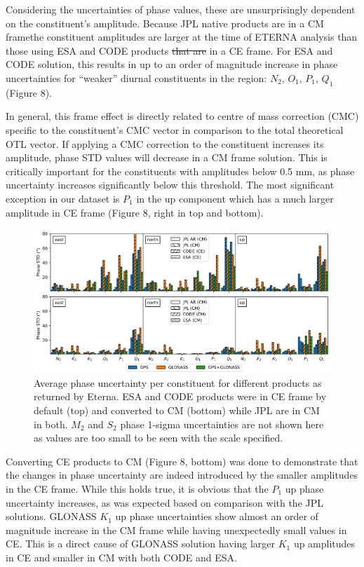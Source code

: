 \documentclass[se, manuscript]{copernicus}
\providecommand{\DIFadd}[1]{{\protect\color{blue}\uwave{#1}}} %
\providecommand{\DIFdel}[1]{{\protect\color{red}\sout{#1}}}                      %
\providecommand{\DIFaddbegin}{} %
\providecommand{\DIFaddend}{} %
\providecommand{\DIFdelbegin}{} %
\providecommand{\DIFdelend}{} %
\begin{document}
Considering the uncertainties of phase values, these are unsurprisingly dependent on the constituent’s amplitude. Because JPL native products are in a CM frame\DIFaddbegin \DIFadd{, }\DIFaddend the constituent amplitudes are larger at the time of ETERNA analysis than those using ESA and CODE products \DIFdelbegin \DIFdel{that are }\DIFdelend \DIFaddbegin \DIFadd{which are both provided }\DIFaddend in a CE frame. For \DIFaddbegin \DIFadd{the }\DIFaddend ESA and CODE solution, this results in up to an order of magnitude increase in phase uncertainties for “weaker” diurnal constituents in the region: $N_2$, $O_1$, $P_1$, $Q_1$ (Figure 8).

In general, this frame effect is directly related to centre of mass correction (CMC) specific to the constituent's CMC vector in comparison to the total theoretical OTL vector. If applying a CMC correction to the constituent increases its amplitude, phase STD values will decrease in a CM frame solution. This is critically important for the constituents with amplitudes below 0.5 mm, as phase uncertainty increases significantly below this threshold. The most significant exception in our dataset is $P_1$ in the up component which has a much larger amplitude in CE frame (Figure 8, right in top and bottom). 

\begin{figure}[t]
\includegraphics[width=17cm]{fig08.png}
\caption{Average phase uncertainty per constituent for different products as returned by Eterna. ESA and CODE products were in CE frame by default (top) and converted to CM (bottom) while JPL are in CM in both. $M_2$ and $S_2$ phase 1-sigma uncertainties are not shown here as values are too small to be seen with the scale specified.}
\end{figure}

Converting CE products to CM (Figure 8, bottom) was done to demonstrate that the changes in phase uncertainty are indeed introduced by the smaller amplitudes in the CE frame. While this holds true, it is obvious that the $P_1$ up phase uncertainty increases, as was expected based on comparison with the JPL solutions. GLONASS $K_1$ up phase uncertainties show almost an order of magnitude increase in the CM frame while having unexpectedly small values in CE. This is a direct cause of GLONASS solution having larger $K_1$ up amplitudes in CE and smaller in CM with both CODE and ESA.
\end{document}
